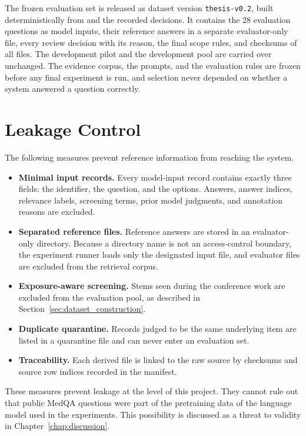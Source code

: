 The frozen evaluation set is released as dataset version \texttt{thesis-v0.2}, built deterministically from \dataversion{} and the recorded decisions. It contains the 28 evaluation questions as model inputs, their reference answers in a separate evaluator-only file, every review decision with its reason, the final scope rules, and checksums of all files. The development pilot and the development pool are carried over unchanged. The evidence corpus, the prompts, and the evaluation rules are frozen before any final experiment is run, and selection never depended on whether a system answered a question correctly.

\section{Leakage Control}
\label{sec:leakage_control}

The following measures prevent reference information from reaching the system.

\begin{itemize}
  \item \textbf{Minimal input records.} Every model-input record contains exactly three fields: the identifier, the question, and the options. Answers, answer indices, relevance labels, screening terms, prior model judgments, and annotation reasons are excluded.
  \item \textbf{Separated reference files.} Reference answers are stored in an evaluator-only directory. Because a directory name is not an access-control boundary, the experiment runner loads only the designated input file, and evaluator files are excluded from the retrieval corpus.
  \item \textbf{Exposure-aware screening.} Stems seen during the conference work are excluded from the evaluation pool, as described in Section~\ref{sec:dataset_construction}.
  \item \textbf{Duplicate quarantine.} Records judged to be the same underlying item are listed in a quarantine file and can never enter an evaluation set.
  \item \textbf{Traceability.} Each derived file is linked to the raw source by checksums and source row indices recorded in the manifest.
\end{itemize}

These measures prevent leakage at the level of this project. They cannot rule out that public MedQA questions were part of the pretraining data of the language model used in the experiments. This possibility is discussed as a threat to validity in Chapter~\ref{chap:discussion}.

